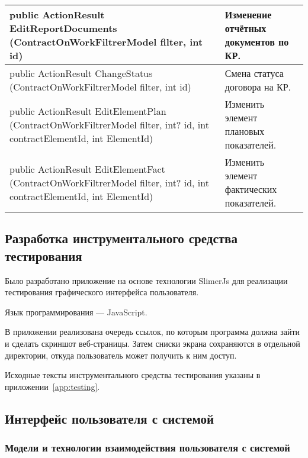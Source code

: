 \begin{myTable}
\begin{longtable}[h]{|p{}|p{}|}
	public ActionResult EditReportDocuments (ContractOnWorkFiltrerModel filter, int id) & Изменение отчётных документов по КР. \\ \hline
	public ActionResult ChangeStatus (ContractOnWorkFiltrerModel filter, int id) & Смена статуса договора на КР. \\ \hline
	public ActionResult EditElementPlan (ContractOnWorkFiltrerModel filter, int? id, int contractElementId, int ElementId) & Изменить элемент плановых показателей. \\ \hline
	public ActionResult EditElementFact (ContractOnWorkFiltrerModel filter, int? id, int contractElementId, int ElementId) & Изменить элемент фактических показателей. \\ \hline
\end{longtable}
\end{myTable}

\subsection{Разработка инструментального средства тестирования}

Было разработано приложение на основе технологии SlimerJs для реализации тестирования графического интерфейса пользователя.

Язык программирования --- JavaScript.

В приложении реализована очередь ссылок, по которым программа должна зайти и сделать скриншот веб-страницы.
Затем сниски экрана сохраняются в отдельной директории, откуда пользователь может получить к ним доступ.

Исходные тексты инструментального средства тестирования указаны в приложении~\ref{app:testing}.


\subsection{Интерфейс пользователя с системой}

\subsubsection{Модели и технологии взаимодействия пользователя с системой}

